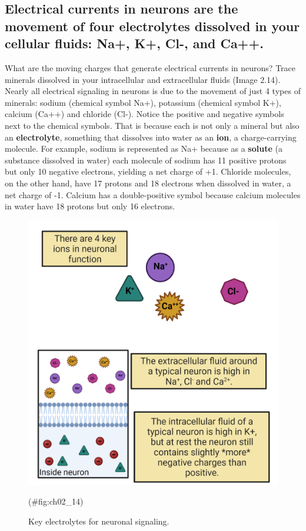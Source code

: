 \documentclass[
]{book}
\begin{document}
\hypertarget{electrical-currents-in-neurons-are-the-movement-of-four-electrolytes-dissolved-in-your-cellular-fluids-na-k-cl--and-ca.}{%
\subsection{Electrical currents in neurons are the movement of four electrolytes dissolved in your cellular fluids: Na+, K+, Cl-, and Ca++.}\label{electrical-currents-in-neurons-are-the-movement-of-four-electrolytes-dissolved-in-your-cellular-fluids-na-k-cl--and-ca.}}

What are the moving charges that generate electrical currents in neurons? Trace minerals dissolved in your intracellular and extracellular fluids (Image 2.14). Nearly all electrical signaling in neurons is due to the movement of just 4 types of minerals: sodium (chemical symbol Na+), potassium (chemical symbol K+), calcium (Ca++) and chloride (Cl-). Notice the positive and negative symbols next to the chemical symbols. That is because each is not only a mineral but also an \textbf{electrolyte}, something that dissolves into water as an \textbf{ion}, a charge-carrying molecule. For example, sodium is represented as Na+ because as a \textbf{solute} (a substance dissolved in water) each molecule of sodium has 11 positive protons but only 10 negative electrons, yielding a net charge of +1. Chloride molecules, on the other hand, have 17 protons and 18 electrons when dissolved in water, a net charge of -1. Calcium has a double-positive symbol because calcium molecules in water have 18 protons but only 16 electrons.

\begin{figure}

{\centering \includegraphics[width=0.8\linewidth]{images/ch02/02_14} 

}

\caption{Key electrolytes for neuronal signaling.}(\#fig:ch02_14)
\end{figure}
\end{document}
